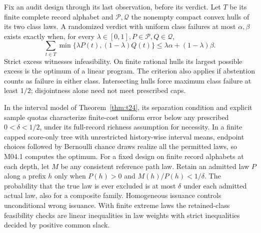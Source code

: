 \begin{theorem}\label{ext:m042}

Fix an audit design through its last observation, before its verdict. Let \(T\) be its finite complete record alphabet and \(\mathcal P,\mathcal Q\) the nonempty compact convex hulls of its two class laws. A randomized verdict with uniform class failures at most \(\alpha,\beta\) exists exactly when, for every \(\lambda\in[0,1],P\in\mathcal P,Q\in\mathcal Q\),
\[
\sum_{t\in T}\min\{\lambda P(t),(1-\lambda)Q(t)\}
\le\lambda\alpha+(1-\lambda)\beta .
\]
Strict excess witnesses infeasibility. On finite rational hulls its largest possible excess is the optimum of a linear program. The criterion also applies if abstention counts as failure in either class. Intersecting hulls force maximum class failure at least \(1/2\); disjointness alone need not meet prescribed caps.

\end{theorem}

\begin{theorem}\label{ext:m043}

In the interval model of Theorem~\ref{thm:t24}, its separation condition and explicit sample quotas characterize finite-cost uniform error below any prescribed \(0<\delta<1/2\), under its full-record richness assumption for necessity. In a finite capped score-only tree with unrestricted history-wise interval means, endpoint choices followed by Bernoulli chance draws realize all the permitted laws, so M04.1 computes the optimum. For a fixed design on finite record alphabets at each depth, let \(M\) be any consistent reference path law. Retain an admitted law \(P\) along a prefix \(h\) only when \(P(h)>0\) and \(M(h)/P(h)<1/\delta\). The probability that the true law is ever excluded is at most \(\delta\) under each admitted actual law, also for a composite family. Homogeneous issuance controls unconditional wrong issuance. With finite extreme laws the retained-class feasibility checks are linear inequalities in law weights with strict inequalities decided by positive common slack.

\end{theorem}

